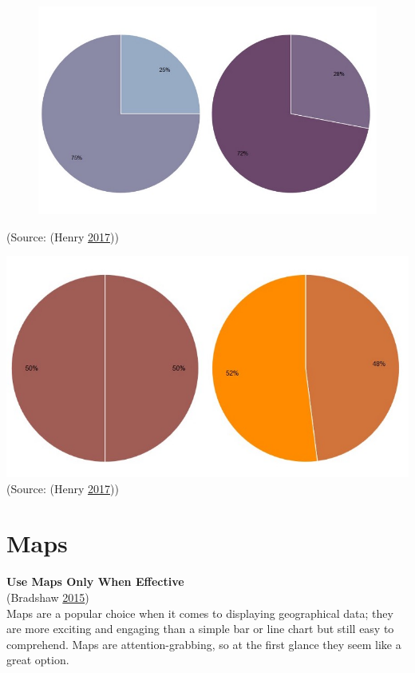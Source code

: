 \documentclass[]{book}
\theoremstyle{definition}
\theoremstyle{definition}
\theoremstyle{definition}
\theoremstyle{remark}
\begin{document}
\begin{figure}
\centering
\includegraphics{images/henry-quarter.png}
\caption{}
\end{figure}

(Source: (Henry \protect\hyperlink{ref-henry-defense-pie}{2017}))

\includegraphics{images/henry-half.png} (Source: (Henry
\protect\hyperlink{ref-henry-defense-pie}{2017}))

\section{Maps}\label{maps}

\textbf{Use Maps Only When Effective}\\
(Bradshaw \protect\hyperlink{ref-Bradshaw}{2015})\\
Maps are a popular choice when it comes to displaying geographical data;
they are more exciting and engaging than a simple bar or line chart but
still easy to comprehend. Maps are attention-grabbing, so at the first
glance they seem like a great option.
\end{document}
